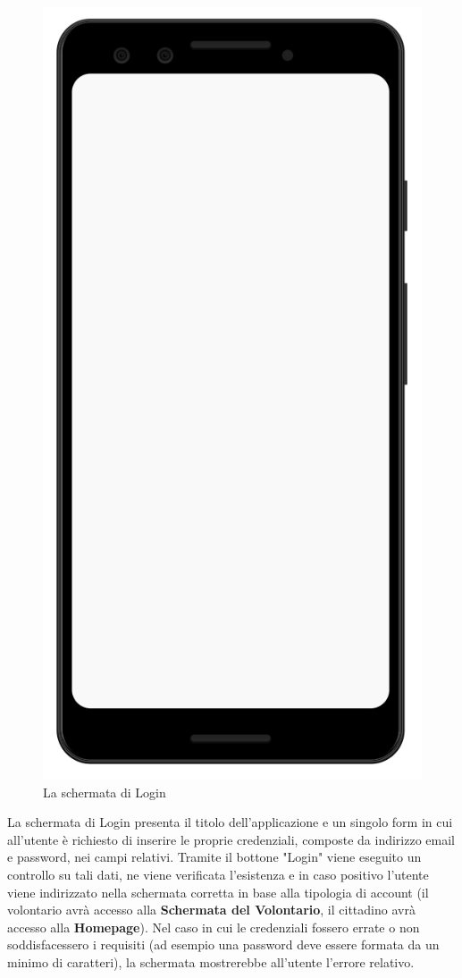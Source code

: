 \documentclass[12pt,a4paper,twoside,openright,titlepage]{book}
\begin{document}
\begin{figure}[H]
\includegraphics[scale = 0.2]{mobile}
\caption{La schermata di Login}
\end{figure}
La schermata di Login presenta il titolo dell'applicazione e un singolo form in cui all'utente è richiesto di inserire le proprie credenziali, composte da indirizzo email e password, nei campi relativi. Tramite il bottone "Login" viene eseguito un controllo su tali dati, ne viene verificata l'esistenza e in caso positivo l'utente viene indirizzato nella schermata corretta in base alla tipologia di account (il volontario avrà accesso alla \textbf{Schermata del Volontario}, il cittadino avrà accesso alla \textbf{Homepage}). Nel caso in cui le credenziali fossero errate o non soddisfacessero i requisiti (ad esempio una password deve essere formata da un minimo di caratteri), la schermata mostrerebbe all'utente l'errore relativo.\newline
\end{document}
